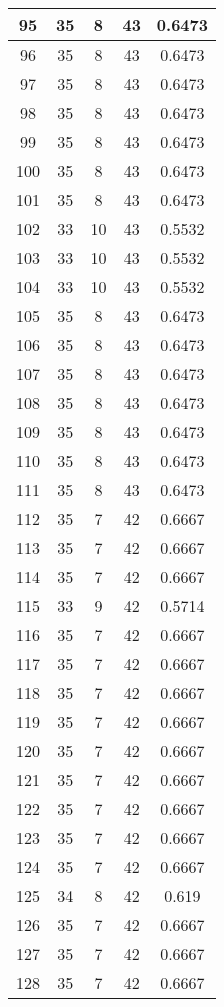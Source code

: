 \documentclass[letterpaper, 12pt]{article}
\begin{document}
\begin{longtable}{|c|c|c|c|c|}
95 & 35 & 8 & 43 & 0.6473 \\
\hline
96 & 35 & 8 & 43 & 0.6473 \\
\hline
97 & 35 & 8 & 43 & 0.6473 \\
\hline
98 & 35 & 8 & 43 & 0.6473 \\
\hline
99 & 35 & 8 & 43 & 0.6473 \\
\hline
100 & 35 & 8 & 43 & 0.6473 \\
\hline
101 & 35 & 8 & 43 & 0.6473 \\
\hline
102 & 33 & 10 & 43 & 0.5532 \\
\hline
103 & 33 & 10 & 43 & 0.5532 \\
\hline
104 & 33 & 10 & 43 & 0.5532 \\
\hline
105 & 35 & 8 & 43 & 0.6473 \\
\hline
106 & 35 & 8 & 43 & 0.6473 \\
\hline
107 & 35 & 8 & 43 & 0.6473 \\
\hline
108 & 35 & 8 & 43 & 0.6473 \\
\hline
109 & 35 & 8 & 43 & 0.6473 \\
\hline
110 & 35 & 8 & 43 & 0.6473 \\
\hline
111 & 35 & 8 & 43 & 0.6473 \\
\hline
112 & 35 & 7 & 42 & 0.6667 \\
\hline
113 & 35 & 7 & 42 & 0.6667 \\
\hline
114 & 35 & 7 & 42 & 0.6667 \\
\hline
115 & 33 & 9 & 42 & 0.5714 \\
\hline
116 & 35 & 7 & 42 & 0.6667 \\
\hline
117 & 35 & 7 & 42 & 0.6667 \\
\hline
118 & 35 & 7 & 42 & 0.6667 \\
\hline
119 & 35 & 7 & 42 & 0.6667 \\
\hline
120 & 35 & 7 & 42 & 0.6667 \\
\hline
121 & 35 & 7 & 42 & 0.6667 \\
\hline
122 & 35 & 7 & 42 & 0.6667 \\
\hline
123 & 35 & 7 & 42 & 0.6667 \\
\hline
124 & 35 & 7 & 42 & 0.6667 \\
\hline
125 & 34 & 8 & 42 & 0.619 \\
\hline
126 & 35 & 7 & 42 & 0.6667 \\
\hline
127 & 35 & 7 & 42 & 0.6667 \\
\hline
128 & 35 & 7 & 42 & 0.6667 \\

\end{longtable}
\end{document}
